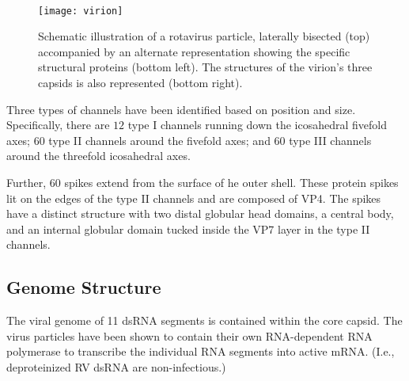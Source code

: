 \begin{figure}[htp]
\begin{center}
\\[1cm]
\texttt{[image: virion]}
\end{center}
\caption{Schematic illustration of a rotavirus particle, laterally bisected (top) accompanied by an alternate representation showing the specific structural proteins (bottom left). The structures of the virion's three capsids is also represented (bottom right).}
\label{fig01}
\end{figure}

Three types of channels have been identified based on position and size. Specifically, there are $12$ type I channels running down the icosahedral fivefold axes; 60 type II channels around the fivefold axes; and 60 type III channels around the threefold icosahedral axes.

Further, 60 spikes extend from the surface of he outer shell. These protein spikes lit on the edges of the type II channels and are composed of VP4. The spikes have a distinct structure with two distal globular head domains, a central body, and an internal globular domain tucked inside the VP7 layer in the type II channels.  

\subsection{Genome Structure}

The viral genome of 11 dsRNA segments is contained within the core capsid. The virus particles have been shown to contain their own RNA-dependent RNA polymerase to transcribe the individual RNA segments into active mRNA. (I.e., deproteinized RV dsRNA are non-infectious.)

